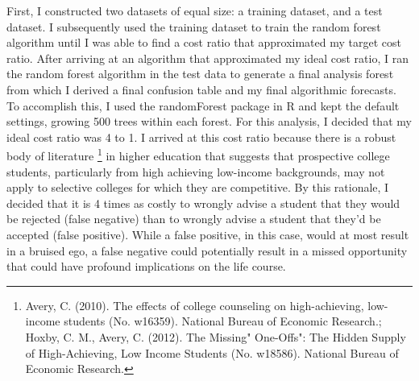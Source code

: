 \documentclass[titlepage]{article}   	%
\begin{document}
First, I constructed two datasets of equal size: a training dataset, and a test dataset. I subsequently used the training dataset to train the random forest algorithm until I was able to find a cost ratio that approximated my target cost ratio. After arriving at an algorithm that approximated my ideal cost ratio, I ran the random forest algorithm in the test data to generate a final analysis forest from which I derived a final confusion table and my final algorithmic forecasts. To accomplish this, I used the randomForest package in R and kept the default settings, growing 500 trees within each forest. For this analysis, I decided that my ideal cost ratio was 4 to 1. I arrived at this cost ratio because there is a robust body of literature \footnote{\label{myfootnote} Avery, C. (2010). The effects of college counseling on high-achieving, low-income students (No. w16359). National Bureau of Economic Research.; Hoxby, C. M., Avery, C. (2012). The Missing" One-Offs": The Hidden Supply of High-Achieving, Low Income Students (No. w18586). National Bureau of Economic Research.} in higher education that suggests that prospective college students, particularly from high achieving low-income backgrounds, may not apply to selective colleges for which they are competitive. By this rationale, I decided that it is 4 times as costly to wrongly advise a student that they would be rejected (false negative) than to wrongly advise a student that they’d be accepted (false positive). While a false positive, in this case, would at most result in a bruised ego, a false negative could potentially result in a missed opportunity that could have profound implications on the life course. 
\end{document}
